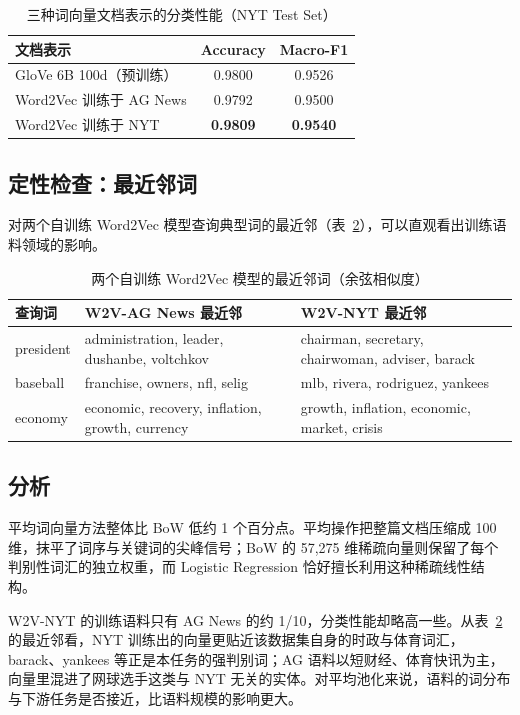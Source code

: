 \documentclass[UTF8,a4paper,10pt]{ctexart}
\begin{document}
\begin{table}[!htbp]
  \centering
  \begin{tabular}{lcc}
  \toprule
  文档表示 & Accuracy & Macro-F1 \\
  \midrule
  GloVe 6B 100d（预训练）     & 0.9800 & 0.9526 \\
  Word2Vec 训练于 AG News     & 0.9792 & 0.9500 \\
  Word2Vec 训练于 NYT         & \textbf{0.9809} & \textbf{0.9540} \\
  \bottomrule
  \end{tabular}
  \caption{三种词向量文档表示的分类性能（NYT Test Set）}
  \label{tab:task2}
\end{table}

\subsection{定性检查：最近邻词}

对两个自训练 Word2Vec 模型查询典型词的最近邻（表~\ref{tab:nn}），可以直观看出训练语料领域的影响。

\begin{table}[!htbp]
  \centering
  \small
  \begin{tabular}{lll}
  \toprule
  查询词 & W2V-AG News 最近邻 & W2V-NYT 最近邻 \\
  \midrule
  president & administration, leader, dushanbe, voltchkov & chairman, secretary, chairwoman, adviser, barack \\
  baseball  & franchise, owners, nfl, selig              & mlb, rivera, rodriguez, yankees \\
  economy   & economic, recovery, inflation, growth, currency & growth, inflation, economic, market, crisis \\
  \bottomrule
  \end{tabular}
  \caption{两个自训练 Word2Vec 模型的最近邻词（余弦相似度）}
  \label{tab:nn}
\end{table}

\subsection{分析}

平均词向量方法整体比 BoW 低约 1 个百分点。平均操作把整篇文档压缩成 100 维，抹平了词序与关键词的尖峰信号；BoW 的 57,275 维稀疏向量则保留了每个判别性词汇的独立权重，而 Logistic Regression 恰好擅长利用这种稀疏线性结构。

W2V-NYT 的训练语料只有 AG News 的约 1/10，分类性能却略高一些。从表~\ref{tab:nn} 的最近邻看，NYT 训练出的向量更贴近该数据集自身的时政与体育词汇，barack、yankees 等正是本任务的强判别词；AG 语料以短财经、体育快讯为主，向量里混进了网球选手这类与 NYT 无关的实体。对平均池化来说，语料的词分布与下游任务是否接近，比语料规模的影响更大。
\end{document}
